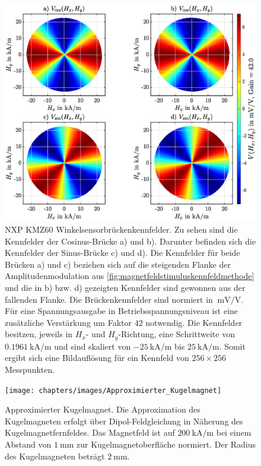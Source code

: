 	
	\clearpage
	\begin{figure}[tbph]
		\centering
		\includegraphics[width=\linewidth]{chapters/images/KMZ60_Kennfelder}
		\caption[NXP KMZ60 Winkelsensorbrückenkennfelder]{NXP KMZ60 Winkelsensorbrückenkennfelder. Zu sehen sind die 
		Kennfelder der Cosinus-Brücke a) und b). Darunter befinden sich die Kennfelder der Sinus-Brücke c) und d). 
		Die Kennfelder für beide Brücken a) und c) beziehen sich auf die steigenden Flanke der Amplitudenmodulation aus 
		\autoref{fig:magnetfeldstimuluskennfeldmethode} und die in b) bzw. d) gezeigten Kennfelder sind gewonnen aus 
		der fallenden Flanke. Die Brückenkennfelder sind normiert in $\SI{}{\milli\volt\per\volt}$. Für eine 
		Spannungsausgabe in Betriebsspannungsniveau ist eine zusätzliche Verstärkung um Faktor $42$ notwendig. Die 
		Kennfelder besitzen, jeweils in $H_x$- und $H_y$-Richtung, eine Schrittweite von 
		$\SI{0.1961}{\kilo\ampere\per\metre}$ und sind skaliert von $\SI{-25}{\kilo\ampere\per\metre}$ bis 
		$\SI{+25}{\kilo\ampere\per\metre}$. Somit ergibt sich eine Bildauflösung für ein Kennfeld von $256 \times 256$ 
		Messpunkten.}
		\label{fig:kmz60kennfelder}
	\end{figure}
	
	
	\clearpage
	\begin{figure}[tbph]
		\centering
		\texttt{[image: chapters/images/Approximierter\_Kugelmagnet]}
		\caption[Approximierter Kugelmagnet]{Approximierter Kugelmagnet. Die Approximation des Kugelmagneten erfolgt 
		über Dipol-Feldgleichung in Näherung des Kugelmagnetfernfeldes. Das Magnetfeld ist auf 
		$\SI{200}{\kilo\ampere\per\metre}$ bei einem Abstand von $\SI{1}{\milli\metre}$ zur Kugelmagnetoberfläche 
		normiert. Der Radius des Kugelmagneten beträgt $\SI{2}{\milli\metre}$.}
		\label{fig:dipolemagnet}
	\end{figure}
	
